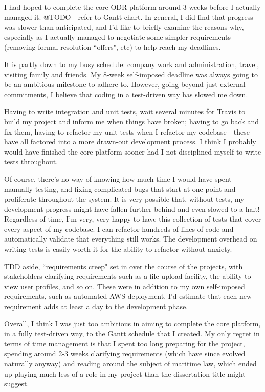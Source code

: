 I had hoped to complete the core ODR platform around 3 weeks before I actually managed it. @TODO - refer to Gantt chart. In general, I did find that progress was slower than anticipated, and I'd like to briefly examine the reasons why, especially as I actually managed to negotiate some simpler requirements (removing formal resolution ``offers", etc) to help reach my deadlines.

It is partly down to my busy schedule: company work and administration, travel, visiting family and friends. My 8-week self-imposed deadline was always going to be an ambitious milestone to adhere to. However, going beyond just external commitments, I believe that coding in a test-driven way has slowed me down.

Having to write integration and unit tests, wait several minutes for Travis to build my project and inform me when things have broken; having to go back and fix them, having to refactor my unit tests when I refactor my codebase - these have all factored into a more drawn-out development process. I think I probably would have finished the core platform sooner had I not disciplined myself to write tests throughout.

Of course, there's no way of knowing how much time I would have spent manually testing, and fixing complicated bugs that start at one point and proliferate throughout the system. It is very possible that, without tests, my development progress might have fallen further behind and even slowed to a halt! Regardless of time, I'm very, very happy to have this collection of tests that cover every aspect of my codebase. I can refactor hundreds of lines of code and automatically validate that everything still works. The development overhead on writing tests is easily worth it for the ability to refactor without anxiety.

TDD aside, ``requirements creep" set in over the course of the projects, with stakeholders clarifying requirements such as a file upload facility, the ability to view user profiles, and so on. These were in addition to my own self-imposed requirements, such as automated AWS deployment. I'd estimate that each new requirement adds at least a day to the development phase.

Overall, I think I was just too ambitious in aiming to complete the core platform, in a fully test-driven way, to the Gantt schedule that I created. My only regret in terms of time management is that I spent too long preparing for the project, spending around 2-3 weeks clarifying requirements (which have since evolved naturally anyway) and reading around the subject of maritime law, which ended up playing much less of a role in my project than the dissertation title might suggest.

